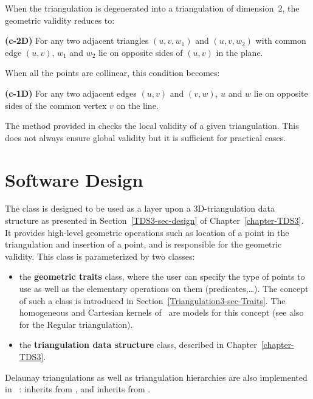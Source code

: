 When the triangulation is degenerated into a triangulation of
dimension~2, the  geometric validity reduces to:

{\bf (c-2D)} For any two adjacent triangles $(u,v,w_1)$ and $(u,v,w_2)$ with
common edge $(u,v)$, $w_1$ and $w_2$ lie on opposite sides of $(u,v)$
in the plane.

When all the points are collinear, this condition becomes:

{\bf (c-1D)} For any two adjacent edges $(u,v)$ and $(v,w)$, $u$ and
$w$ lie on opposite sides of the common vertex $v$ on the line.

The  method provided in  checks
the local validity of a given triangulation. This does not always
ensure global validity \cite{mnssssu-cgpvg-96,dlpt-ccpps-98} but it is 
sufficient for practical cases.

\section{Software Design}
\label{Triangulation3-sec-design}

The class  is
designed to be used as  
a layer upon a 3D-triangulation data structure as presented in 
Section~\ref{TDS3-sec-design} of Chapter~\ref{chapter-TDS3}.
It provides high-level geometric operations such as location of a point
in the triangulation and insertion of a point, and is responsible for
the geometric validity. This class is parameterized by two classes:
\begin{itemize}
\item {} the \textbf{geometric traits} class, where the user can
specify the type of points to use as well as the elementary
operations on them (predicates,\ldots). The concept of such a class is
introduced in Section~\ref{Triangulation3-sec-Traits}.  The homogeneous and Cartesian
kernels of \cgal\ are models for this concept
(see also  
for the Regular triangulation).
\item {} the \textbf{triangulation data structure} class, 
described in Chapter~\ref{chapter-TDS3}.
\end{itemize}	

Delaunay triangulations as well as triangulation hierarchies
\cite{d-iirdt-98} are also implemented in \cgal~: 
inherits from  
, and 
 inherits from .

